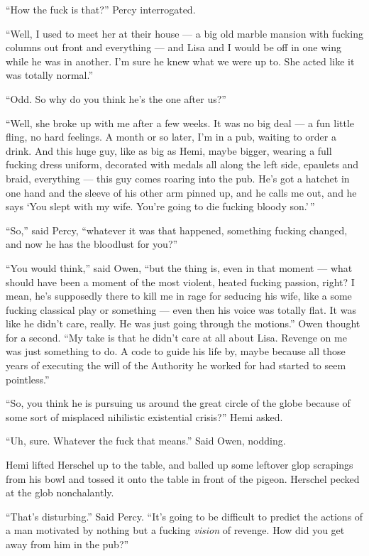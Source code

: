 \documentclass[]{scrbook}
\begin{document}
``How the fuck is that?'' Percy interrogated.

``Well, I used to meet her at their house --- a big old marble mansion
with fucking columns out front and everything --- and Lisa and I would
be off in one wing while he was in another. I'm sure he knew what we
were up to. She acted like it was totally normal.''

``Odd. So why do you think he's the one after us?''

``Well, she broke up with me after a few weeks. It was no big deal --- a
fun little fling, no hard feelings. A month or so later, I'm in a pub,
waiting to order a drink. And this huge guy, like as big as Hemi, maybe
bigger, wearing a full fucking dress uniform, decorated with medals all
along the left side, epaulets and braid, everything --- this guy comes
roaring into the pub. He's got a hatchet in one hand and the sleeve of
his other arm pinned up, and he calls me out, and he says `You slept
with my wife. You're going to die fucking bloody son.'\,''

``So,'' said Percy, ``whatever it was that happened, something fucking
changed, and now he has the bloodlust for you?''

``You would think,'' said Owen, ``but the thing is, even in that moment
--- what should have been a moment of the most violent, heated fucking
passion, right? I mean, he's supposedly there to kill me in rage for
seducing his wife, like a some fucking classical play or something ---
even then his voice was totally flat. It was like he didn't care,
really. He was just going through the motions.'' Owen thought for a
second. ``My take is that he didn't care at all about Lisa. Revenge on
me was just something to do. A code to guide his life by, maybe because
all those years of executing the will of the Authority he worked for had
started to seem pointless.''

``So, you think he is pursuing us around the great circle of the globe
because of some sort of misplaced nihilistic existential crisis?'' Hemi
asked.

``Uh, sure. Whatever the fuck that means.'' Said Owen, nodding.

Hemi lifted Herschel up to the table, and balled up some leftover glop
scrapings from his bowl and tossed it onto the table in front of the
pigeon. Herschel pecked at the glob nonchalantly.

``That's disturbing.'' Said Percy. ``It's going to be difficult to
predict the actions of a man motivated by nothing but a fucking
\emph{vision} of revenge. How did you get away from him in the pub?''
\end{document}
